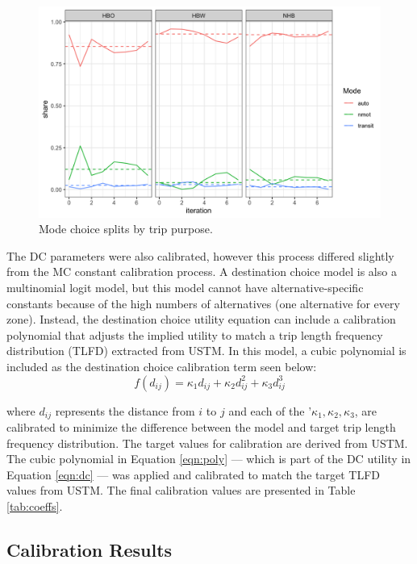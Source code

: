   \begin{figure}

  {\centering \includegraphics[width=0.75\linewidth]{figures/chapter3/MC_split.png}

  }

  \caption{Mode choice splits by trip purpose.}\label{fig:nhbmc}
  \end{figure}

The DC parameters were also calibrated, however this process differed slightly
from the MC constant calibration process. A destination choice model is also a
multinomial logit model, but this model cannot have alternative-specific
constants because of the high numbers of alternatives (one alternative for
every zone). Instead, the destination choice utility equation can include a
calibration polynomial that adjusts the implied utility to match a trip length
frequency distribution (TLFD) extracted from USTM. In this model, a
cubic polynomial  is included as the destination choice calibration term seen below:
\begin{equation}
  f(d_{ij}) = \kappa_1 d_{ij} + \kappa_2 d_{ij}^2 + \kappa_3 d_{ij}^3
	\label{eqn:poly}
\end{equation}

\noindent where $d_{ij}$ represents the distance from $i$ to $j$
and each of the  '$\kappa_1,\kappa_2,\kappa_3$, are calibrated to minimize the
difference between the model and target trip length frequency distribution. The target
values for calibration are derived from USTM. The cubic polynomial in
Equation \ref{eqn:poly} --- which is part of the DC utility in
Equation \ref{eqn:dc} --- was applied and calibrated to match the target TLFD
values from USTM. The final calibration values are presented in Table
\ref{tab:coeffs}.

\subsection{Calibration Results}

